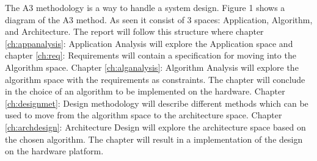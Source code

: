 The A3 methodology is a way to handle a system design. Figure 1 shows a diagram of the A3 method.  As seen it consist of 3 spaces: Application, Algorithm, and Architecture. The report will follow this structure where chapter \ref{ch:appanalysis}: Application Analysis will explore the Application space and chapter \ref{ch:req}: Requirements will contain a specification for moving into the Algorithm space. 
Chapter \ref{ch:alganalysis}: Algorithm Analysis will explore the algorithm space with the requirements as constraints. The chapter will conclude in the choice of an algorithm to be implemented on the hardware.
Chapter \ref{ch:designmet}: Design methodology will describe different methods which can be used to move from the algorithm space to the architecture space.
Chapter \ref{ch:archdesign}: Architecture Design will explore the architecture space based on the chosen algorithm. The chapter will result in a implementation of the design on the hardware platform.


